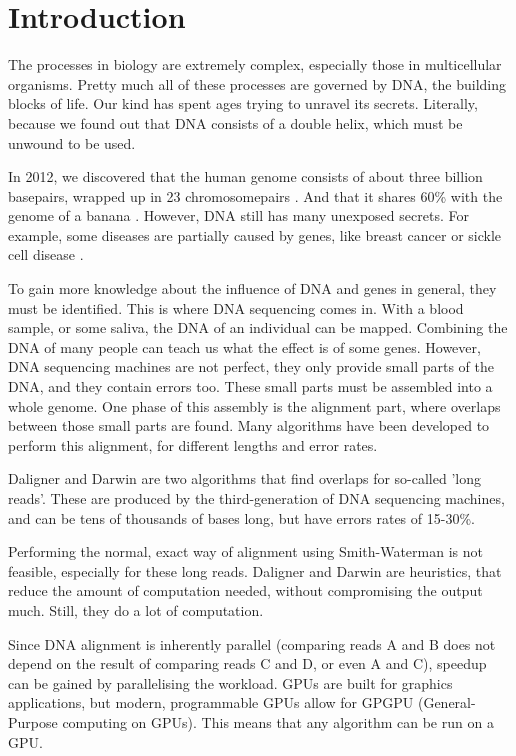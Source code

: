 \documentclass[../main/thesis.tex]{subfiles}
\begin{document}
\chapter{Introduction}
\ifdefined\main
\else

\fi

The processes in biology are extremely complex, especially those in multicellular organisms.
Pretty much all of these processes are governed by DNA, the building blocks of life.
Our kind has spent ages trying to unravel its secrets.
Literally, because we found out that DNA consists of a double helix, which must be unwound to be used.

In 2012, we discovered that the human genome consists of about three billion basepairs, wrapped up in 23 chromosomepairs \cite{human_genome_project}.
And that it shares 60\% with the genome of a banana \cite{banana}.
However, DNA still has many unexposed secrets.
For example, some diseases are partially caused by genes, like breast cancer or sickle cell disease \cite{genomic_diseases}.

To gain more knowledge about the influence of DNA and genes in general, they must be identified.
This is where DNA sequencing comes in.
With a blood sample, or some saliva, the DNA of an individual can be mapped.
Combining the DNA of many people can teach us what the effect is of some genes.
However, DNA sequencing machines are not perfect, they only provide small parts of the DNA, and they contain errors too.
These small parts must be assembled into a whole genome.
One phase of this assembly is the alignment part, where overlaps between those small parts are found.
Many algorithms have been developed to perform this alignment, for different lengths and error rates.

Daligner and Darwin are two algorithms that find overlaps for so-called 'long reads'.
These are produced by the third-generation of DNA sequencing machines, and can be tens of thousands of bases long, but have errors rates of 15-30\%.

Performing the normal, exact way of alignment using Smith-Waterman is not feasible, especially for these long reads.
Daligner and Darwin are heuristics, that reduce the amount of computation needed, without compromising the output much.
Still, they do a lot of computation.

Since DNA alignment is inherently parallel (comparing reads A and B does not depend on the result of comparing reads C and D, or even A and C), speedup can be gained by parallelising the workload.
GPUs are built for graphics applications, but modern, programmable GPUs allow for GPGPU (General-Purpose computing on GPUs).
This means that any algorithm can be run on a GPU.
\end{document}
